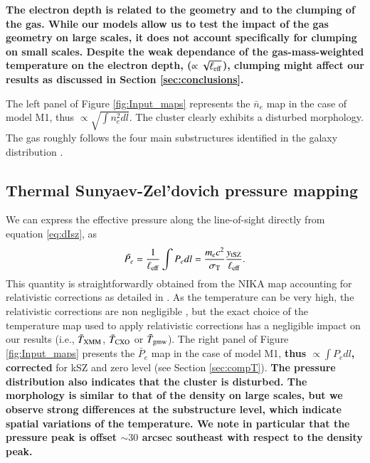 \documentclass[twocolumn,traditabstract]{aa}
\begin{document}
{\bf The electron depth is related to the geometry and to the clumping of the gas. While our models allow us to test the impact of the gas geometry on large scales, it does not account specifically for clumping on small scales. Despite the weak dependance of the gas-mass-weighted temperature on the electron depth, ($\propto \sqrt{\ell_{\rm eff}}$), clumping might affect our results as discussed in Section \ref{sec:conclusions}.

The left panel of Figure \ref{fig:Input_maps} represents the $\bar{n}_e$ map in the case of model M1, thus $\propto \sqrt{\int n_e^2 dl}$. The cluster clearly exhibits a disturbed morphology. The gas roughly follows the four main substructures identified in the galaxy distribution \citep{Ma2009}.}

\subsection{Thermal Sunyaev-Zel'dovich pressure mapping}
We can express the effective pressure along the line-of-sight directly from equation \ref{eq:dIsz}, as
\begin{equation}
	\bar{P_e} = \frac{1}{\ell_{\rm eff}} \int P_e dl = \frac{m_e c^2}{\sigma_{\rm T}} \frac{y_{\rm tSZ}}{\ell_{\rm eff}}.
\label{eq:pseudo_p}
\end{equation}
This quantity is straightforwardly obtained from the NIKA map accounting for relativistic corrections as detailed in \cite{Adam2016b}. As the temperature can be very high, the relativistic corrections are non negligible \citep{Pointecouteau1998,Itoh2003}, but the exact choice of the temperature map used to apply relativistic corrections has a negligible impact on our results (i.e., $\bar{T}_{\rm XMM}$, $\bar{T}_{\rm CXO}$ or $\bar{T}_{\rm gmw}$). The right panel of Figure \ref{fig:Input_maps} presents the $\bar{P}_e$ map in the case of model M1, {\bf thus $\propto \int P_e dl$, corrected} for kSZ and zero level (see Section \ref{sec:compT}). {\bf The pressure distribution also indicates that the cluster is disturbed. The morphology is similar to that of the density on large scales, but we observe strong differences at the substructure level, which indicate spatial variations of the temperature. We note in particular that the pressure peak is offset $\sim 30$ arcsec southeast with respect to the density peak.}
\end{document}
